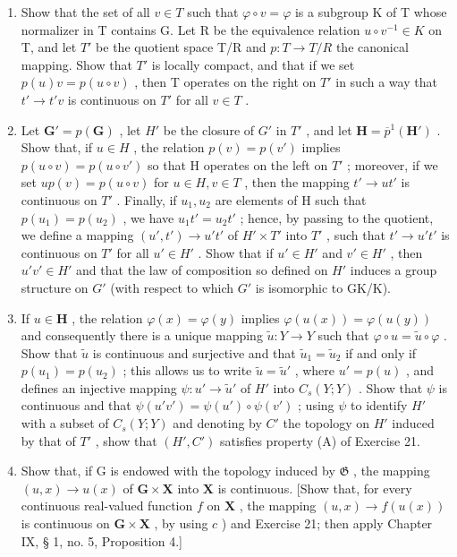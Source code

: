\begin{enumerate}
\def\labelenumi{\alph{enumi})}
\item
  Show that the set of all \(v \in T\) such that \(\varphi \circ v = \varphi\) is a subgroup K of T whose normalizer in T contains G. Let R be the equivalence relation \(u \circ v^{-1} \in K\) on T, and let \(T'\) be the quotient space T/R and \(p: T \to T/R\) the canonical mapping. Show that \(T'\) is locally compact, and that if we set \(p(u)v = p(u \circ v)\) , then T operates on the right on \(T'\) in such a way that \(t' \to t'v\) is continuous on \(T'\) for all \(v \in T\) .
\item
  Let \(\mathbf{G}' = p(\mathbf{G})\) , let \(H'\) be the closure of \(G'\) in \(T'\) , and let \(\mathbf{H} = \overline{p}^{1}(\mathbf{H}')\) . Show that, if \(u \in H\) , the relation \(p(v) = p(v')\) implies \(p(u \circ v) = p(u \circ v')\) so that H operates on the left on \(T'\) ; moreover, if we set \(up(v) = p(u \circ v)\) for \(u \in H, v \in T\) , then the mapping \(t' \to ut'\) is continuous on \(T'\) . Finally, if \(u_1, u_2\) are elements of H such that \(p(u_1) = p(u_2)\) , we have \(u_1t' = u_2t'\) ; hence, by passing to the quotient, we define a mapping \((u', t') \to u't'\) of \(H' \times T'\) into \(T'\) , such that \(t' \to u't'\) is continuous on \(T'\) for all \(u' \in H'\) . Show that if \(u' \in H'\) and \(v' \in H'\) , then \(u'v' \in H'\) and that the law of composition so defined on \(H'\) induces a group structure on \(G'\) (with respect to which \(G'\) is isomorphic to GK/K).
\item
  If \(u \in \mathbf{H}\) , the relation \(\varphi(x) = \varphi(y)\) implies \(\varphi(u(x)) = \varphi(u(y))\) and consequently there is a unique mapping \(\tilde{u}: Y \to Y\) such that \(\varphi \circ u = \tilde{u} \circ \varphi\) . Show that \(\tilde{u}\) is continuous and surjective and that \(\tilde{u}_1 = \tilde{u}_2\) if and only if \(p(u_1) = p(u_2)\) ; this allows us to write \(\tilde{u} = \tilde{u}'\) , where \(u' = p(u)\) , and defines an injective mapping \(\psi: u' \to \tilde{u}'\) of \(H'\) into \(C_s(Y; Y)\) . Show that \(\psi\) is continuous and that \(\psi(u'v') = \psi(u') \circ \psi(v')\) ; using \(\psi\) to identify \(H'\) with a subset of \(C_s(Y; Y)\) and denoting by \(C'\) the topology on \(H'\) induced by that of \(T'\) , show that \((H', C')\) satisfies property (A) of Exercise 21.
\item
  Show that, if G is endowed with the topology induced by \(\mathfrak{G}\) , the mapping \((u, x) \to u(x)\) of \(\mathbf{G} \times \mathbf{X}\) into \(\mathbf{X}\) is continuous. {[}Show that, for every continuous real-valued function \(f\) on \(\mathbf{X}\) , the mapping \((u, x) \to f(u(x))\) is continuous on \(\mathbf{G} \times \mathbf{X}\) , by using \(c\) ) and Exercise 21; then apply Chapter IX, § 1, no. 5, Proposition 4.{]}
\end{enumerate}

